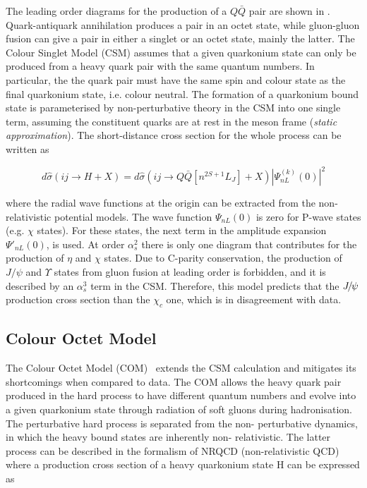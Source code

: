 The leading order diagrams for the production of a $Q\bar{Q}$ pair are shown in
. Quark-antiquark annihilation produces a pair in an octet
state, while gluon-gluon fusion can give a  pair in either a singlet or an
octet state, mainly the latter. The Colour Singlet Model (CSM)\cite{Humpert:171969}
assumes that a given quarkonium state can only be produced from a heavy quark
pair with the same quantum numbers. In particular, the the quark pair must have
the same spin and colour state as the final quarkonium state, i.e. colour
neutral. The formation of a quarkonium bound state is parameterised by
non-perturbative theory in the CSM into one single term, assuming the constituent
quarks are at rest in the meson frame ({\it{static approximation}}). The 
short-distance cross section for the whole process can be written as

\begin{equation}
d{\hat{\sigma}}(ij\rightarrow H + X) = d{\hat{\sigma}}(ij\rightarrow Q{\bar{Q}}\left[n^{2S+1}L_J\right] + X) 
|\Psi^{(k)}_{nL}(0)|^2
\end{equation}

\noindent where the radial wave functions at the origin can be extracted from
the non-relativistic potential models. The wave function $\Psi_{nL}(0)$ is zero
for P-wave states (e.g. $\chi$ states). For these states, the next term in the
amplitude expansion $\Psi'_{nL}(0)$, is used. At order $\alpha_s^2$ there is
only one diagram that contributes for the production of $\eta$ and $\chi$
states. Due to C-parity conservation, the production of $J/\psi$ and $\Upsilon$
states from gluon fusion at leading order is forbidden, and it is described by
an $\alpha_s^3$ term in the CSM. Therefore, this model predicts that the
${{J\mskip -3mu/\mskip -2mu\psi\mskip 2mu}}$ production cross section than the $\chi_c$ one, which is in
disagreement with data.

\subsection{Colour Octet Model}

The Colour Octet Model (COM)~\cite{Braaten:1993rw,Bodwin:1994jh} extends the CSM calculation and
mitigates its shortcomings when compared to data. The COM allows the heavy
quark pair produced in the hard process to have different quantum numbers and
evolve into a given quarkonium state through radiation of soft gluons during
hadronisation. The perturbative hard process is separated from the non-
perturbative dynamics, in which the heavy bound states are inherently non-
relativistic. The latter process can be described in the formalism of NRQCD
(non-relativistic QCD) where a production cross section of a heavy quarkonium
state H can be expressed as

